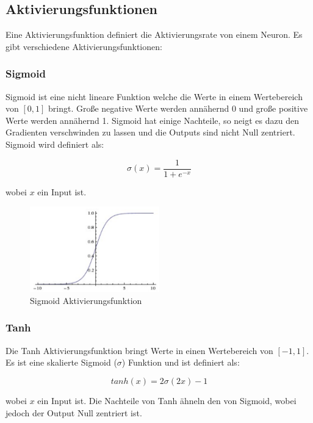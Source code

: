 \newpage
\subsection{Aktivierungsfunktionen}\label{subsection:aktivierungsfunktionen}
Eine Aktivierungsfunktion definiert die Aktivierungsrate von einem Neuron. Es gibt verschiedene Aktivierungsfunktionen:

\subsubsection{Sigmoid}
Sigmoid ist eine nicht lineare Funktion welche die Werte in einem Wertebereich von $ [0, 1] $ bringt.
Große negative Werte werden annähernd 0 und große positive Werte werden annähernd 1. Sigmoid hat einige Nachteile, so neigt es dazu den Gradienten
verschwinden zu lassen und die Outputs sind nicht Null zentriert. Sigmoid wird definiert als:

\begin{equation}
  \sigma(x) = \frac{1}{1 + e^{-x}}
\end{equation}

wobei $x$ ein Input ist.

\begin{figure}[H]
  \centering
  \includegraphics[width=0.5\textwidth]{resources/nn/sigmoid.png}
  \caption{
    Sigmoid Aktivierungsfunktion
    \cite{neuron-model}
  }
  \label{image:sigmoid}
\end{figure}

\subsubsection{Tanh}
Die Tanh Aktivierungsfunktion bringt Werte in einen Wertebereich von $ [-1, 1] $. Es ist eine skalierte Sigmoid ($ \sigma $) Funktion
und ist definiert als:

\begin{equation}
  tanh(x) = 2\sigma(2x) - 1
\end{equation}

wobei $x$ ein Input ist.
Die Nachteile von Tanh ähneln den von Sigmoid, wobei jedoch der Output Null zentriert ist.

